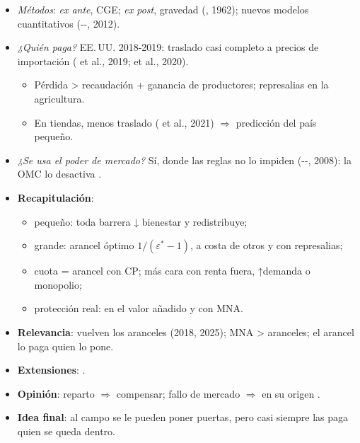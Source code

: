 \documentclass{article}
\begin{document}
\begin{columnas}
\begin{itemize}
\item \emph{Métodos}: \emph{ex ante}, CGE; \emph{ex post}, gravedad (, 1962); nuevos modelos cuantitativos (--, 2012).
\item \emph{¿Quién paga?} EE.\,UU. 2018-2019: traslado casi completo a precios de importación ( et al., 2019;  et al., 2020).
  \begin{itemize}
  \item Pérdida > recaudación + ganancia de productores; represalias en la agricultura.
  \item En tiendas, menos traslado ( et al., 2021) $\Rightarrow$ predicción del país pequeño.
  \end{itemize}
\item \emph{¿Se usa el poder de mercado?} Sí, donde las reglas no lo impiden (--, 2008): la OMC lo desactiva .
\end{itemize}

\begin{itemize}
\item \textbf{Recapitulación}:
  \begin{itemize}
  \item pequeño: toda barrera ↓ bienestar y redistribuye;
  \item grande: arancel óptimo $1/(\varepsilon^*-1)$, a costa de otros y con represalias;
  \item cuota = arancel con CP; más cara con renta fuera, ↑demanda o monopolio;
  \item protección real: en el valor añadido y con MNA.
  \end{itemize}
\item \textbf{Relevancia}: vuelven los aranceles (2018, 2025); MNA > aranceles; el arancel lo paga quien lo pone.
\item \textbf{Extensiones}:     .
\item \textbf{Opinión}: reparto $\Rightarrow$ compensar; fallo de mercado $\Rightarrow$ en su origen .
\item \textbf{Idea final}: al campo se le pueden poner puertas, pero casi siempre las paga quien se queda dentro.
\end{itemize}


\end{columnas}
\end{document}
